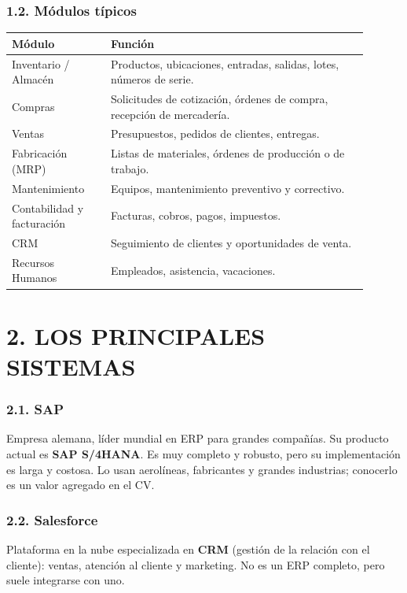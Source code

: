 \subsubsection*{1.2. Módulos típicos}
\begin{center}
\small
\begin{tabular}{|p{0.25\linewidth}|p{0.65\linewidth}|}
\hline
\textbf{Módulo} & \textbf{Función} \\ \hline
Inventario / Almacén & Productos, ubicaciones, entradas, salidas, lotes, números de serie. \\ \hline
Compras & Solicitudes de cotización, órdenes de compra, recepción de mercadería. \\ \hline
Ventas & Presupuestos, pedidos de clientes, entregas. \\ \hline
Fabricación (MRP) & Listas de materiales, órdenes de producción o de trabajo. \\ \hline
Mantenimiento & Equipos, mantenimiento preventivo y correctivo. \\ \hline
Contabilidad y facturación & Facturas, cobros, pagos, impuestos. \\ \hline
CRM & Seguimiento de clientes y oportunidades de venta. \\ \hline
Recursos Humanos & Empleados, asistencia, vacaciones. \\ \hline
\end{tabular}
\end{center}

\section*{2. LOS PRINCIPALES SISTEMAS}

\subsubsection*{2.1. SAP}
Empresa alemana, líder mundial en ERP para grandes compañías. Su producto actual es
\textbf{SAP S/4HANA}. Es muy completo y robusto, pero su implementación es larga y costosa.
Lo usan aerolíneas, fabricantes y grandes industrias; conocerlo es un valor agregado en el CV.

\subsubsection*{2.2. Salesforce}
Plataforma en la nube especializada en \textbf{CRM} (gestión de la relación con el cliente):
ventas, atención al cliente y marketing. No es un ERP completo, pero suele integrarse con uno.

